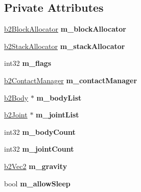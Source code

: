 \subsection*{Private Attributes}
\begin{DoxyCompactItemize}
\item 
\mbox{\label{classb2World_ab02b03963ed73501770f7a89c9186e72}} 
\mbox{\hyperlink{classb2BlockAllocator}{b2\+Block\+Allocator}} {\bfseries m\+\_\+block\+Allocator}
\item 
\mbox{\label{classb2World_a9c56dd143340d0db681a7bb2f0c937e3}} 
\mbox{\hyperlink{classb2StackAllocator}{b2\+Stack\+Allocator}} {\bfseries m\+\_\+stack\+Allocator}
\item 
\mbox{\label{classb2World_a1b5cd8c24bf3a900dca9a7acec207e60}} 
int32 {\bfseries m\+\_\+flags}
\item 
\mbox{\label{classb2World_adc5b9e56c3d3c84993901dda29341140}} 
\mbox{\hyperlink{classb2ContactManager}{b2\+Contact\+Manager}} {\bfseries m\+\_\+contact\+Manager}
\item 
\mbox{\label{classb2World_acb01b9fe3ae8e3014883d2cd8da5534a}} 
\mbox{\hyperlink{classb2Body}{b2\+Body}} $\ast$ {\bfseries m\+\_\+body\+List}
\item 
\mbox{\label{classb2World_abe24b2f269cec46974c4331bd5418f41}} 
\mbox{\hyperlink{classb2Joint}{b2\+Joint}} $\ast$ {\bfseries m\+\_\+joint\+List}
\item 
\mbox{\label{classb2World_aa24704aec207b3ae8359a2ffe6d01411}} 
int32 {\bfseries m\+\_\+body\+Count}
\item 
\mbox{\label{classb2World_a1f722f498830b3fcfc86792555f0f57f}} 
int32 {\bfseries m\+\_\+joint\+Count}
\item 
\mbox{\label{classb2World_a3c8ec39b73bdec820e03b17ef1d18b28}} 
\mbox{\hyperlink{structb2Vec2}{b2\+Vec2}} {\bfseries m\+\_\+gravity}
\item 
\mbox{\label{classb2World_a5a31013145f978e964cfee64c3c46d7e}} 
bool {\bfseries m\+\_\+allow\+Sleep}

\end{DoxyCompactItemize}
